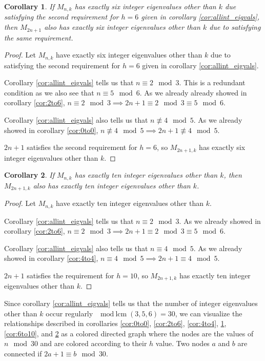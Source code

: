 \documentclass[12pt]{article}
\newtheorem{corollary}{Corollary}
\begin{document}
	\begin{corollary}\label{cor:6to6}
		If $M_{n,k}$ has exactly six integer eigenvalues other than $k$ due satisfying
		the second requirement for $h=6$ given in corollary \ref{cor:allint_eigvals},
		then $M_{2n+1}$ also has exactly six integer eigenvalues other than $k$ due to
		satisfying the same requirement.
	\end{corollary}
	\begin{proof}
		Let $M_{n,k}$ have exactly six integer eigenvalues other than $k$ due to
		satisfying the second requirement for $h=6$ given in corollary
		\ref{cor:allint_eigvals}.
		
		Corollary \ref{cor:allint_eigvals} tells us that $n \equiv 2 \mod 3$.
		This is a redundant condition as we also see that $n \equiv 5 \mod 6$.
		As we already already showed in corollary \ref{cor:2to6}, $n \equiv 2 \mod 3
		\implies 2n+1 \equiv 2 \mod 3 \equiv 5 \mod 6$.
		
		Corollary \ref{cor:allint_eigvals} also tells us that $n \not\equiv  4 \mod
		5$.
		As we already showed in corollary \ref{cor:0to0}, $n \not\equiv 4 \mod 5
		\implies 2n+1 \not\equiv 4 \mod 5$.
		
		$2n+1$ satisfies the second requirement for $h=6$, so $M_{2n+1,k}$ has exactly
		six integer eigenvalues other than $k$.
	\end{proof}
	
	\begin{corollary}\label{cor:10to10}
		If $M_{n,k}$ has exactly ten integer eigenvalues other than $k$, then
		$M_{2n+1,k}$ also has exactly ten integer eigenvalues other than $k$.
	\end{corollary}
	\begin{proof}
		Let $M_{n,k}$ have exactly ten integer eigenvalues other than $k$.
		
		Corollary \ref{cor:allint_eigvals} tells us that $n \equiv 2 \mod 3$.
		As we already showed in corollary \ref{cor:2to6}, $n \equiv 2 \mod 3 \implies
		2n+1 \equiv 2 \mod 3 \equiv 5 \mod 6$.
		
		Corollary \ref{cor:allint_eigvals} also tells us that $n \equiv 4 \mod 5$.
		As we already showed in corollary \ref{cor:4to4}, $n \equiv 4 \mod 5 \implies
		2n+1 \equiv 4 \mod 5$.
		
		$2n+1$ satisfies the requirement for $h=10$, so $M_{2n+1,k}$ has exactly ten
		integer eigenvalues other than $k$.
	\end{proof}
	
	Since corollary \ref{cor:allint_eigvals} tells us that the number of integer
	eigenvalues other than $k$ occur regularly $\mod \text{lcm}(3,5,6) = 30$, we can
	visualize the relationships described in corollaries \ref{cor:0to0},
	\ref{cor:2to6}, \ref{cor:4to4}, \ref{cor:6to6}, \ref{cor:6to10}, and
	\ref{cor:10to10} as a colored directed graph where the nodes are the values of
	$n \mod 30$ and are colored according to their $h$ value. Two nodes $a$ and $b$
	are connected if $2a+1 \equiv b \mod 30$.
	
\end{document}
